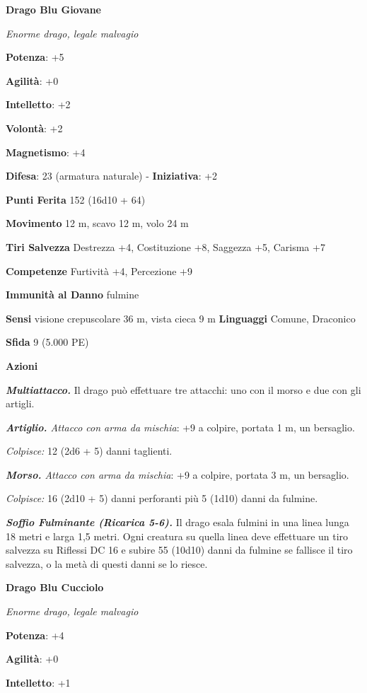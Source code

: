 \begin{multicols}{2}
\textbf{Drago Blu Giovane}

\emph{Enorme drago, legale malvagio}

\textbf{Potenza}: +5

\textbf{Agilità}: +0

\textbf{Intelletto}: +2

\textbf{Volontà}: +2

\textbf{Magnetismo}: +4

\textbf{Difesa}: 23 (armatura naturale) - \textbf{Iniziativa}: +2

\textbf{Punti Ferita} 152 (16d10 + 64)

\textbf{Movimento} 12 m, scavo 12 m, volo 24 m

\textbf{Tiri Salvezza} Destrezza +4, Costituzione +8, Saggezza +5,
Carisma +7

\textbf{Competenze} Furtività +4, Percezione +9

\textbf{Immunità al Danno} fulmine

\textbf{Sensi} visione crepuscolare 36 m, vista cieca 9 m
\textbf{Linguaggi} Comune, Draconico

\textbf{Sfida} 9 (5.000 PE)\smallskip

\smallskip\textbf{Azioni}

\emph{\textbf{Multiattacco.}} Il drago può effettuare tre attacchi: uno
con il morso e due con gli artigli.

\emph{\textbf{Artiglio.} Attacco con arma da mischia}: +9 a colpire,
portata 1 m, un bersaglio.

\emph{Colpisce:} 12 (2d6 + 5) danni taglienti.

\emph{\textbf{Morso.} Attacco con arma da mischia}: +9 a colpire,
portata 3 m, un bersaglio.

\emph{Colpisce:} 16 (2d10 + 5) danni perforanti più 5 (1d10) danni da
fulmine.

\emph{\textbf{Soffio Fulminante (Ricarica 5-6).}} Il drago esala fulmini
in una linea lunga 18 metri e larga 1,5 metri. Ogni creatura su quella
linea deve effettuare un tiro salvezza su Riflessi DC 16 e subire 55
(10d10) danni da fulmine se fallisce il tiro salvezza, o la metà di
questi danni se lo riesce.

\textbf{Drago Blu Cucciolo}

\emph{Enorme drago, legale malvagio}

\textbf{Potenza}: +4

\textbf{Agilità}: +0

\textbf{Intelletto}: +1


\end{multicols}
